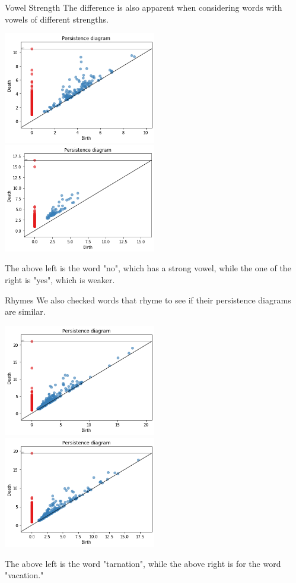 \documentclass[14pt,aspectratio=169, serif, dvipsnames]{beamer}
\begin{document}
\begin{frame}{Vowel Strength}
    The difference is also apparent when considering words with vowels of different strengths. 
        \begin{center}
        \includegraphics[width = 0.5\textwidth]{pictures/no_pers_plot.png}
        \hspace{-0.6cm}
        \includegraphics[width = 0.5\textwidth]{pictures/yes_pers_plot.png}
    \end{center}
    The above left is the word "no", which has a strong vowel, while the one of the right is "yes", which is weaker.
\end{frame}

\begin{frame}{Rhymes}
    We also checked words that rhyme to see if their persistence diagrams are similar. 
    \begin{center}
        \includegraphics[width = 0.5\textwidth]{pictures/tarnation_pers_plot.png}
        \hspace{-0.6cm}
        \includegraphics[width=0.5\textwidth]{pictures/vacation_pers_plot.png}
    \end{center}
    The above left is the word "tarnation", while the above right is for the word "vacation."
\end{frame}
\end{document}
